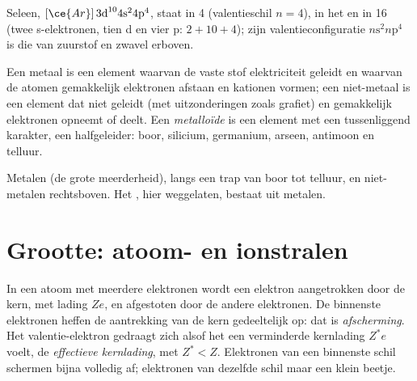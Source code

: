 \begin{example}\label{ex:b1:periodicity:position}
Seleen, $[\ce{Ar}]\,3\text{d}^{10} 4\text{s}^2 4\text{p}^4$, staat in
 4 (valentieschil $n = 4$), in het  en in  16 (twee
s-elektronen, tien d en vier p: $2 + 10 + 4$); zijn valentieconfiguratie
$n\text{s}^2 n\text{p}^4$ is die van zuurstof en zwavel erboven.
\end{example}

\begin{definition}\label{def:b1:periodicity:metalloid}
Een metaal is een element waarvan de vaste stof elektriciteit geleidt en
waarvan de atomen gemakkelijk elektronen afstaan en kationen vormen; een
niet-metaal is een element dat niet geleidt (met uitzonderingen zoals
grafiet) en gemakkelijk elektronen opneemt of deelt. Een
\emph{metalloïde} is een element met een
tussenliggend karakter, een halfgeleider: boor, silicium, germanium,
arseen, antimoon en telluur.
\end{definition}

\begin{omfigure}
\omperiodictable[colour=metals, legend, f block=false]

{\small Metalen (de grote meerderheid),  langs een trap van
boor tot telluur, en niet-metalen rechtsboven. Het , hier
weggelaten, bestaat uit metalen.}
\end{omfigure}

\section{Grootte: atoom- en ionstralen}

\begin{definition}\label{def:b1:periodicity:screening}
In een atoom met meerdere elektronen wordt een elektron aangetrokken door
de kern, met lading $Ze$, en afgestoten door de andere elektronen. De
binnenste elektronen heffen de aantrekking van de kern gedeeltelijk op:
dat is \emph{afscherming}. Het valentie-elektron
gedraagt zich alsof het een verminderde kernlading $Z^{*}e$ voelt, de
\emph{effectieve kernlading}, met
$Z^{*} < Z$. Elektronen van een binnenste schil schermen bijna volledig
af; elektronen van dezelfde schil maar een klein beetje.
\end{definition}

